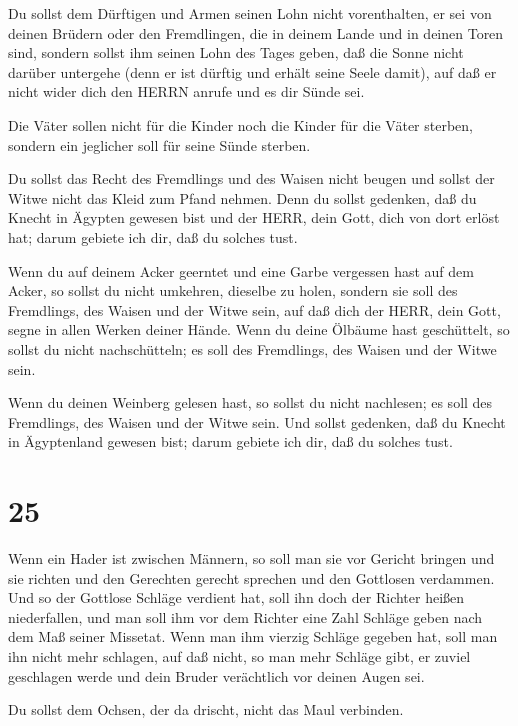  Du sollst dem Dürftigen und Armen seinen Lohn nicht
vorenthalten, er sei von deinen Brüdern oder den Fremdlingen, die in
deinem Lande und in deinen Toren sind,  sondern sollst ihm
seinen Lohn des Tages geben, daß die Sonne nicht darüber untergehe (denn
er ist dürftig und erhält seine Seele damit), auf daß er nicht wider
dich den HERRN anrufe und es dir Sünde sei.

 Die Väter sollen nicht für die Kinder noch die Kinder für
die Väter sterben, sondern ein jeglicher soll für seine Sünde sterben.

 Du sollst das Recht des Fremdlings und des Waisen nicht
beugen und sollst der Witwe nicht das Kleid zum Pfand nehmen.
 Denn du sollst gedenken, daß du Knecht in Ägypten gewesen
bist und der HERR, dein Gott, dich von dort erlöst hat; darum gebiete
ich dir, daß du solches tust.

 Wenn du auf deinem Acker geerntet und eine Garbe vergessen
hast auf dem Acker, so sollst du nicht umkehren, dieselbe zu holen,
sondern sie soll des Fremdlings, des Waisen und der Witwe sein, auf daß
dich der HERR, dein Gott, segne in allen Werken deiner Hände.
 Wenn du deine Ölbäume hast geschüttelt, so sollst du nicht
nachschütteln; es soll des Fremdlings, des Waisen und der Witwe sein.

 Wenn du deinen Weinberg gelesen hast, so sollst du nicht
nachlesen; es soll des Fremdlings, des Waisen und der Witwe sein.
 Und sollst gedenken, daß du Knecht in Ägyptenland gewesen
bist; darum gebiete ich dir, daß du solches tust.

\hypertarget{section-24}{%
\section{25}\label{section-24}}

 Wenn ein Hader ist zwischen Männern, so soll man sie vor
Gericht bringen und sie richten und den Gerechten gerecht sprechen und
den Gottlosen verdammen.  Und so der Gottlose Schläge
verdient hat, soll ihn doch der Richter heißen niederfallen, und man
soll ihm vor dem Richter eine Zahl Schläge geben nach dem Maß seiner
Missetat.  Wenn man ihm vierzig Schläge gegeben hat, soll
man ihn nicht mehr schlagen, auf daß nicht, so man mehr Schläge gibt, er
zuviel geschlagen werde und dein Bruder verächtlich vor deinen Augen
sei.

 Du sollst dem Ochsen, der da drischt, nicht das Maul
verbinden.

